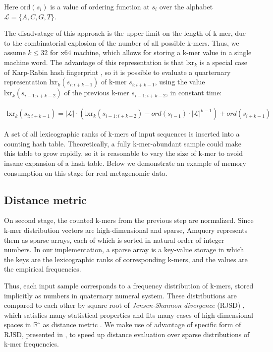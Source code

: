 \documentclass[10pt,letterpaper]{article}
\begin{document}
Here $\mathrm{ord}(s_i)$ is a value of ordering function at $s_i$ over the alphabet ${\mathcal{L}} = \{A, C, G, T \}$. 

The disadvatage of this approach is the upper limit on the length of k-mer, due to the combinatorial explosion of the number of all possible k-mers. Thus, we assume $k \leq 32$ for x64 machine, which allows for storing a k-mer value in a single machine word.
The advantage of this representation is that $\mathrm{lxr}_k$ is a special case of Karp-Rabin hash fingerprint \cite{karp1987efficient}, so it is possible to evaluate a quarternary representation $\mathrm{lxr}_k(s_{i:i+k-1})$ of k-mer $s_{i:i+k-1}$, using the value $\mathrm{lxr}_k(s_{i−1:i+k-2})$ of the previous k-mer $s_{i−1:i+k-2}$, in constant time:

\begin{eqnarray}
\label{eq:schemeP}
    \mathrm{lxr}_k(s_{i:i+k-1}) = |{\mathcal{L}}| \cdot (\mathrm{lxr}_k(s_{i−1:i+k-2}) − ord(s_{i−1}) \cdot 
									 |{\mathcal{L}}|^{k−1}) + ord(s_{i+k−1})
\end{eqnarray}

A set of all lexicographic ranks of k-mers of input sequences is inserted into a counting hash table. Theoretically, a fully k-mer-abundant sample could make this table to grow rapidly, so it is reasonable to vary the size of k-mer to avoid insane expansion of a hash table. Below we demonstrate an example of memory consumption on this stage for real metagenomic data.

\subsection*{Distance metric}
On second stage, the counted k-mers from the previous step are normalized. Since k-mer distribution vectors are high-dimensional and sparse, Amquery represents them as sparse arrays, each of which is sorted in natural order of integer numbers. 
In our implementation, a sparse array is a key-value storage in which the keys are the lexicographic ranks of corresponding k-mers, and the values are the empirical frequencies.

Thus, each input sample corresponds to a frequency distribution of k-mers, stored implicitly as numbers in quaternary numeral system. These distributions are compared to each other by square root of \textit{Jensen-Shannon divergence} (RJSD) \cite{lin1991divergence}, which satisfies many statistical properties and fits many cases of high-dimensional spaces in $\mathbb{R^\star}$ as distance metric \cite{fuglede2004jensen, endres2003new}. We make use of advantage of specific form of RJSD, presented in \cite{connor2013evaluation}, to speed up distance evaluation over sparse distributions of k-mer frequencies.
\end{document}
